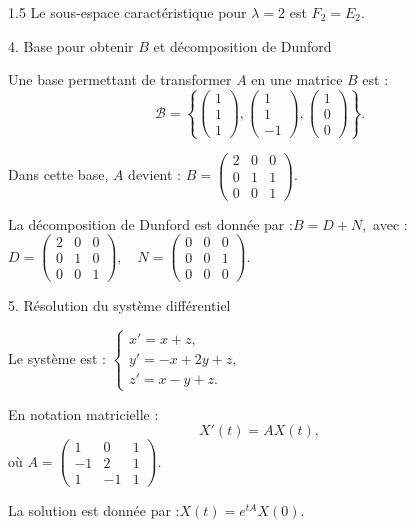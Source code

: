 \documentclass[12pt]{article}
\begin{document}
\begin{spacing}{1.5}
Le sous-espace caractéristique pour $\lambda = 2$ est $F_2 = E_2$.

4. Base pour obtenir $B$ et décomposition de Dunford

Une base permettant de transformer $A$ en une matrice $B$ est :
\[
\mathcal{B} = \left\{\begin{pmatrix} 1 \\ 1 \\ 1 \end{pmatrix}, \begin{pmatrix} 1 \\ 1 \\ -1 \end{pmatrix}, \begin{pmatrix} 1 \\ 0 \\ 0 \end{pmatrix}\right\}.
\]

Dans cette base, $A$ devient :
$
B = \begin{pmatrix}
2 & 0 & 0 \\ 
0 & 1 & 1 \\ 
0 & 0 & 1
\end{pmatrix}.
$

La décomposition de Dunford est donnée par :$
B = D + N,
$
avec :
$
D = \begin{pmatrix}
2 & 0 & 0 \\ 
0 & 1 & 0 \\ 
0 & 0 & 1
\end{pmatrix}, \quad
N = \begin{pmatrix}
0 & 0 & 0 \\ 
0 & 0 & 1 \\ 
0 & 0 & 0
\end{pmatrix}.
$

5. Résolution du système différentiel

Le système est :
$
\begin{cases}
x' = x + z, \\
y' = -x + 2y + z, \\
z' = x - y + z.
\end{cases}
$

En notation matricielle :
\[
X'(t) = AX(t),
\]
où $A = \begin{pmatrix}
1 & 0 & 1 \\ 
-1 & 2 & 1 \\ 
1 & -1 & 1
\end{pmatrix}.
$

La solution est donnée par :$
X(t) = e^{tA}X(0).
$


\end{spacing}
\end{document}
